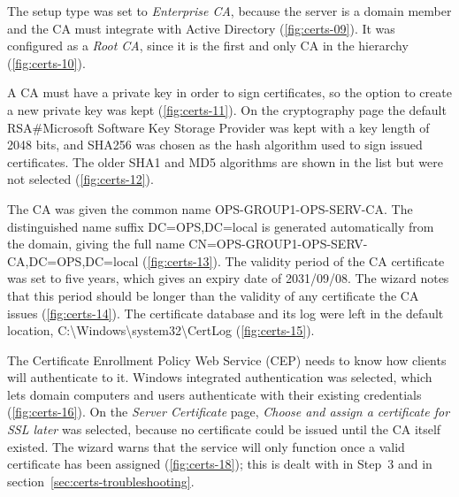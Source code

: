 The setup type was set to \emph{Enterprise CA}, because the server is a domain member and the CA must integrate with Active Directory (\autoref{fig:certs-09}). It was configured as a \emph{Root CA}, since it is the first and only CA in the hierarchy (\autoref{fig:certs-10}).


A CA must have a private key in order to sign certificates, so the option to create a new private key was kept (\autoref{fig:certs-11}). On the cryptography page the default RSA\#Microsoft Software Key Storage Provider was kept with a key length of 2048 bits, and SHA256 was chosen as the hash algorithm used to sign issued certificates. The older SHA1 and MD5 algorithms are shown in the list but were not selected (\autoref{fig:certs-12}).


The CA was given the common name OPS-GROUP1-OPS-SERV-CA. The distinguished name suffix DC=OPS,DC=local is generated automatically from the domain, giving the full name CN=OPS-GROUP1-OPS-SERV-CA,DC=OPS,DC=local (\autoref{fig:certs-13}). The validity period of the CA certificate was set to five years, which gives an expiry date of 2031/09/08. The wizard notes that this period should be longer than the validity of any certificate the CA issues (\autoref{fig:certs-14}). The certificate database and its log were left in the default location, C:\textbackslash Windows\textbackslash system32\textbackslash CertLog (\autoref{fig:certs-15}).


The Certificate Enrollment Policy Web Service (CEP) needs to know how clients will authenticate to it. Windows integrated authentication was selected, which lets domain computers and users authenticate with their existing credentials (\autoref{fig:certs-16}). On the \emph{Server Certificate} page, \emph{Choose and assign a certificate for SSL later} was selected, because no certificate could be issued until the CA itself existed. The wizard warns that the service will only function once a valid certificate has been assigned (\autoref{fig:certs-18}); this is dealt with in Step~3 and in section~\ref{sec:certs-troubleshooting}.

